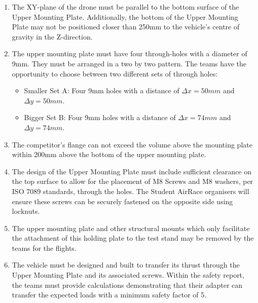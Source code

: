 \documentclass{article}
\begin{document}
\begin{enumerate}
  \item The XY-plane of the drone must be parallel to the bottom surface of the Upper Mounting Plate. Additionally, the bottom of the Upper Mounting Plate may not be positioned closer than 250mm to the vehicle's centre of gravity in the Z-direction.  
  \item The upper mounting plate must have four through-holes with a diameter of 9mm. They must be arranged in a two by two pattern. The teams have the opportunity to choose between two different sets of through holes:
    \begin{itemize}
      \item Smaller Set A: Four 9mm holes with a distance of ${\Delta}x=50mm$ and ${\Delta}y=50mm$.
      \item Bigger Set B: Four 9mm holes with a distance of ${\Delta}x=74mm$ and ${\Delta}y=74mm$.
    \end{itemize}
  \item The competitor's flange can not exceed the volume above the mounting plate within 200mm above the bottom of the upper mounting plate. 
  \item The design of the Upper Mounting Plate must include sufficient clearance on the top surface to allow for the placement of M8 Screws and M8 washers, per ISO 7089 standards, through the holes. The Student AirRace organisers will ensure these screws can be securely fastened on the opposite side using locknuts.
  \item The upper mounting plate and other structural mounts which only facilitate the attachment of this holding plate to the test stand may be removed by the teams for the flights. 
  \item The vehicle must be designed and built to transfer its thrust through the Upper Mounting Plate and its associated screws. Within the safety report, the teams must provide calculations demonstrating that their adapter can transfer the expected loads with a minimum safety factor of 5. \end{enumerate}
\end{document}
